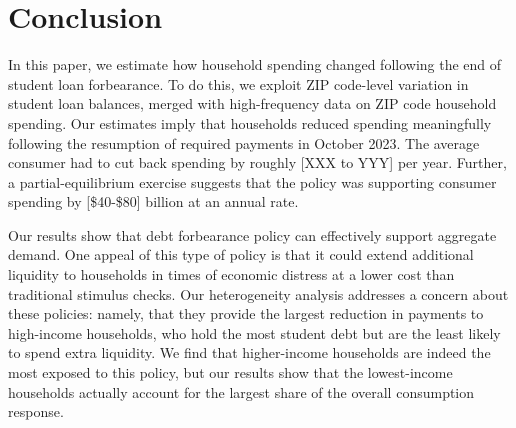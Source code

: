\documentclass[12pt]{article}
\begin{document}

\section{Conclusion \label{sec:conclusion}}

In this paper, we estimate how household spending changed following the end of student loan forbearance. To do this, we exploit ZIP code-level variation in student loan balances, merged with high-frequency data on ZIP code household spending. Our estimates imply that households reduced spending meaningfully following the resumption of required payments in October 2023. The average consumer had to cut back spending by roughly [XXX to YYY] per year. Further, a partial-equilibrium exercise suggests that the policy was supporting consumer spending by [\$40-\$80] billion at an annual rate. %

Our results show that debt forbearance policy can effectively support aggregate demand. One appeal of this type of policy is that it could extend additional liquidity to households in times of economic distress at a lower cost than traditional stimulus checks. Our heterogeneity analysis addresses a concern about these policies: namely, that they provide the largest reduction in payments to high-income households, who hold the most student debt but are the least likely to spend extra liquidity. We find that higher-income households are indeed the most exposed to this policy, but our results show that the lowest-income households actually account for the largest share of the overall consumption response.


 

\end{document}
